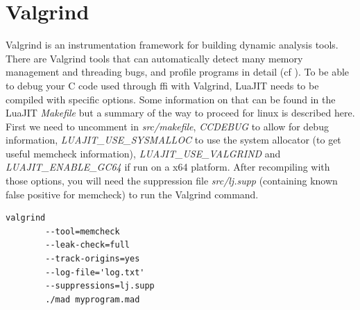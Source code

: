 
\section{Valgrind}
\label{Sec:Valgrind}
    
Valgrind is an instrumentation framework for building dynamic analysis tools.
There are Valgrind tools that can automatically detect many memory management
and threading bugs, and profile programs in detail (cf \cite{valgrind}). To be
able to debug your C code used through ffi with Valgrind, LuaJIT needs to be
compiled with specific options. Some information on that can be found in the
LuaJIT \emph{Makefile} but a summary of the way to proceed for linux is described
here. First we need to uncomment in \emph{src/makefile}, \emph{CCDEBUG} to
allow for debug information, \emph{LUAJIT\_USE\_SYSMALLOC} to use the system
allocator (to get useful memcheck information), \emph{LUAJIT\_USE\_VALGRIND}
and \emph{LUAJIT\_ENABLE\_GC64} if run on a x64 platform. After recompiling
with those options, you will need the suppression file \emph{src/lj.supp}
(containing known false positive for memcheck) to run the Valgrind command.

\begin{lstlisting}[style=CStyle]
valgrind
		--tool=memcheck
		--leak-check=full
		--track-origins=yes
		--log-file='log.txt'
		--suppressions=lj.supp
		./mad myprogram.mad
\end{lstlisting}